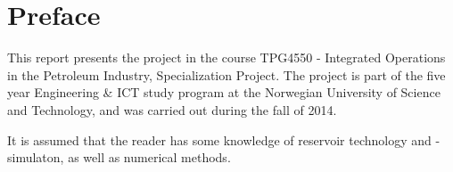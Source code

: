 \section*{Preface} %
This report presents the project in the course TPG4550 - Integrated Operations in the Petroleum Industry, Specialization Project. The project is part of the five year Engineering \& ICT study program at the Norwegian University of Science and Technology, and was carried out during the fall of 2014.

It is assumed that the reader has some knowledge of reservoir technology and -simulaton, as well as numerical methods.
